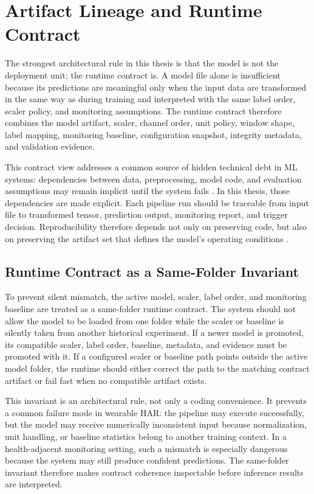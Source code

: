 \section{Artifact Lineage and Runtime Contract}
\label{sec:artifact_lineage_runtime_contract}

The strongest architectural rule in this thesis is that the model is not the deployment unit; the runtime contract is. A model file alone is insufficient because its predictions are meaningful only when the input data are transformed in the same way as during training and interpreted with the same label order, scaler policy, and monitoring assumptions. The runtime contract therefore combines the model artifact, scaler, channel order, unit policy, window shape, label mapping, monitoring baseline, configuration snapshot, integrity metadata, and validation evidence.

This contract view addresses a common source of hidden technical debt in ML systems: dependencies between data, preprocessing, model code, and evaluation assumptions may remain implicit until the system fails \cite{sculley2015debt}. In this thesis, those dependencies are made explicit. Each pipeline run should be traceable from input file to transformed tensor, prediction output, monitoring report, and trigger decision. Reproducibility therefore depends not only on preserving code, but also on preserving the artifact set that defines the model's operating conditions \cite{gardner2018enabling,bahaidarah2021reusable,munappy2019data}.

\subsection{Runtime Contract as a Same-Folder Invariant}
\label{sec:same_folder_invariant}

To prevent silent mismatch, the active model, scaler, label order, and monitoring baseline are treated as a same-folder runtime contract. The system should not allow the model to be loaded from one folder while the scaler or baseline is silently taken from another historical experiment. If a newer model is promoted, its compatible scaler, label order, baseline, metadata, and evidence must be promoted with it. If a configured scaler or baseline path points outside the active model folder, the runtime should either correct the path to the matching contract artifact or fail fast when no compatible artifact exists.

This invariant is an architectural rule, not only a coding convenience. It prevents a common failure mode in wearable HAR: the pipeline may execute successfully, but the model may receive numerically inconsistent input because normalization, unit handling, or baseline statistics belong to another training context. In a health-adjacent monitoring setting, such a mismatch is especially dangerous because the system may still produce confident predictions. The same-folder invariant therefore makes contract coherence inspectable before inference results are interpreted.

